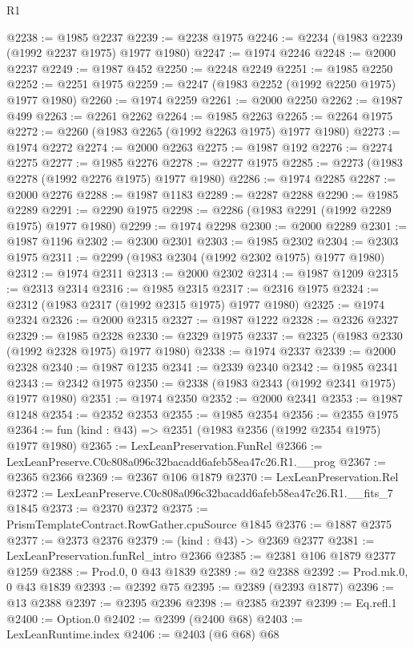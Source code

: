 \begin{lexlean}{R1}
\begin{coremodule}
@2238 := @1985 @2237
@2239 := @2238 @1975
@2246 := @2234 (@1983 @2239 (@1992 @2237 @1975) @1977 @1980)
@2247 := @1974 @2246
@2248 := @2000 @2237
@2249 := @1987 @452
@2250 := @2248 @2249
@2251 := @1985 @2250
@2252 := @2251 @1975
@2259 := @2247 (@1983 @2252 (@1992 @2250 @1975) @1977 @1980)
@2260 := @1974 @2259
@2261 := @2000 @2250
@2262 := @1987 @499
@2263 := @2261 @2262
@2264 := @1985 @2263
@2265 := @2264 @1975
@2272 := @2260 (@1983 @2265 (@1992 @2263 @1975) @1977 @1980)
@2273 := @1974 @2272
@2274 := @2000 @2263
@2275 := @1987 @192
@2276 := @2274 @2275
@2277 := @1985 @2276
@2278 := @2277 @1975
@2285 := @2273 (@1983 @2278 (@1992 @2276 @1975) @1977 @1980)
@2286 := @1974 @2285
@2287 := @2000 @2276
@2288 := @1987 @1183
@2289 := @2287 @2288
@2290 := @1985 @2289
@2291 := @2290 @1975
@2298 := @2286 (@1983 @2291 (@1992 @2289 @1975) @1977 @1980)
@2299 := @1974 @2298
@2300 := @2000 @2289
@2301 := @1987 @1196
@2302 := @2300 @2301
@2303 := @1985 @2302
@2304 := @2303 @1975
@2311 := @2299 (@1983 @2304 (@1992 @2302 @1975) @1977 @1980)
@2312 := @1974 @2311
@2313 := @2000 @2302
@2314 := @1987 @1209
@2315 := @2313 @2314
@2316 := @1985 @2315
@2317 := @2316 @1975
@2324 := @2312 (@1983 @2317 (@1992 @2315 @1975) @1977 @1980)
@2325 := @1974 @2324
@2326 := @2000 @2315
@2327 := @1987 @1222
@2328 := @2326 @2327
@2329 := @1985 @2328
@2330 := @2329 @1975
@2337 := @2325 (@1983 @2330 (@1992 @2328 @1975) @1977 @1980)
@2338 := @1974 @2337
@2339 := @2000 @2328
@2340 := @1987 @1235
@2341 := @2339 @2340
@2342 := @1985 @2341
@2343 := @2342 @1975
@2350 := @2338 (@1983 @2343 (@1992 @2341 @1975) @1977 @1980)
@2351 := @1974 @2350
@2352 := @2000 @2341
@2353 := @1987 @1248
@2354 := @2352 @2353
@2355 := @1985 @2354
@2356 := @2355 @1975
@2364 := fun (kind : @43) => @2351 (@1983 @2356 (@1992 @2354 @1975) @1977 @1980)
@2365 := LexLeanPreservation.FunRel
@2366 := LexLeanPreserve.C0c808a096c32bacadd6afeb58ea47c26.R1.__prog
@2367 := @2365 @2366
@2369 := @2367 @106 @1879
@2370 := LexLeanPreservation.Rel
@2372 := LexLeanPreserve.C0c808a096c32bacadd6afeb58ea47c26.R1.__fits_7 @1845
@2373 := @2370 @2372
@2375 := PrismTemplateContract.RowGather.cpuSource @1845
@2376 := @1887 @2375
@2377 := @2373 @2376
@2379 := (kind : @43) -> @2369 @2377
@2381 := LexLeanPreservation.funRel_intro @2366
@2385 := @2381 @106 @1879 @2377 @1259
@2388 := Prod.{0, 0} @43 @1839
@2389 := @2 @2388
@2392 := Prod.mk.{0, 0} @43 @1839
@2393 := @2392 @75
@2395 := @2389 (@2393 @1877)
@2396 := @13 @2388
@2397 := @2395 @2396
@2398 := @2385 @2397
@2399 := Eq.refl.{1}
@2400 := Option.{0}
@2402 := @2399 (@2400 @68)
@2403 := LexLeanRuntime.index
@2406 := @2403 (@6 @68) @68

\end{coremodule}
\end{lexlean}

